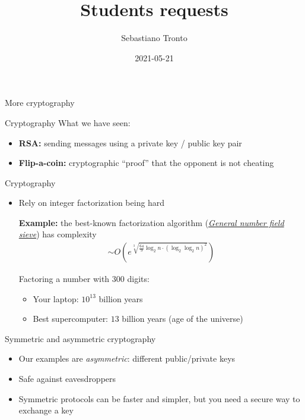\documentclass[11pt]{beamer}
\author[\texttt{sebastiano.tronto@uni.lu}]{Sebastiano Tronto}
\title[Students requests]%
{Students requests}
\date{2021-05-21}
\begin{document}
\begin{frame}
  \titlepage
\end{frame}

\begin{frame}[plain]
	\begin{center} {\Huge More cryptography} \end{center}
\end{frame}

\begin{frame}{Cryptography}
	What we have seen:

	\vspace{0.3cm}
	\begin{itemize}
		\item \textbf{RSA:}
			sending messages using a private key / public key pair
		\item \textbf{Flip-a-coin:}
			cryptographic ``proof'' that the opponent is not cheating
	\end{itemize}
\end{frame}

\begin{frame}{Cryptography}
	\begin{itemize}
		\item Rely on integer factorization being hard

			\vspace{0.3cm}
			\textbf{Example:} the best-known factorization algorithm
			(\href{https://en.wikipedia.org/wiki/General\_number\_field\_sieve}%
			{\emph{General number field sieve}}) has complexity
			\begin{align*}
				\sim O\left(
					e^{\sqrt[3]{\frac{64}{9}\log_2n\cdot(\log_2\log_2n)^2}}
				\right)
			\end{align*}

			Factoring a number with $300$ digits:
			\begin{itemize}
				\item Your laptop: $10^{13}$ billion years
				\item Best supercomputer: $13$ billion years
					(age of the universe)
			\end{itemize}
	\end{itemize}
\end{frame}

\begin{frame}{Symmetric and asymmetric cryptography}
	\begin{itemize}
		\item Our examples are \emph{asymmetric}: different public/private keys
		\item Safe against eavesdroppers
		\item Symmetric protocols can be faster and simpler, but you need
			a secure way to exchange a key
	\end{itemize}
\end{frame}
\end{document}
